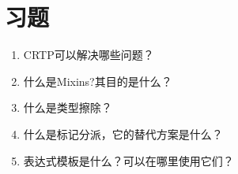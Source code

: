 \section{习题}
\begin{enumerate}
  \item CRTP可以解决哪些问题？
  \item 什么是Mixins?其目的是什么？
  \item 什么是类型擦除？
  \item 什么是标记分派，它的替代方案是什么？
  \item 表达式模板是什么？可以在哪里使用它们？
\end{enumerate}